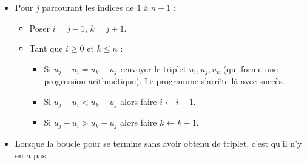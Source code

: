 \documentclass[11pt,class=report,crop=false]{standalone}
\begin{document}
\begin{activite}
\begin{algorithme}
\begin{itemize}
  \item Pour $j$ parcourant les indices de $1$ à $n-1$ :
  
   \begin{itemize}
     \item Poser $i=j-1$, $k=j+1$.
          
     \item Tant que $i \ge 0$ et $k \le n$ :
       \begin{itemize}
         \item Si $u_j-u_i = u_k-u_j$ renvoyer le triplet $u_i,u_j,u_k$ (qui forme une progression arithmétique). Le programme s'arrête là avec succès.
         \item Si $u_j-u_i < u_k-u_j$ alors faire $i \leftarrow i-1$.
         \item Si $u_j-u_i > u_k-u_j$ alors faire $k \leftarrow k+1$.
       \end{itemize}
     \end{itemize}   
   \item Lorsque la boucle \og{}pour\fg{} se termine sans avoir obtenu de triplet, c'est qu'il n'y en a pas.
   
 \end{itemize}  
 \end{algorithme}


\end{activite}

\end{document}
